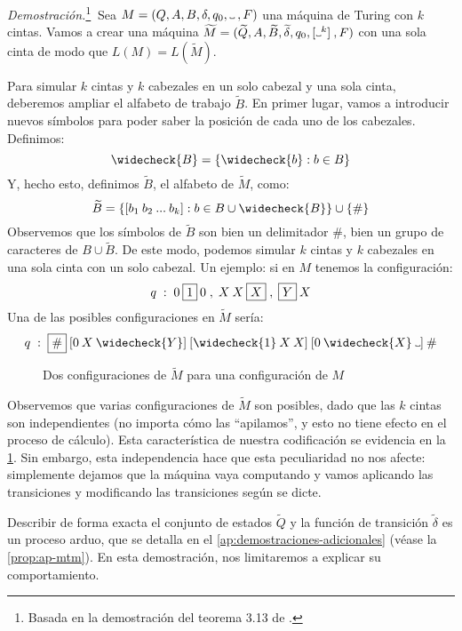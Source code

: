 \begin{proofw}
\emph{Demostración.}\footnote{Basada en la demostración del teorema 3.13 de \cite{Sipser2012}.}$\;\;$Sea $M=(Q, A, B, \delta, q_0, \Vtextvisiblespace\:, F)$ una máquina de Turing con $k$ cintas. Vamos a crear una máquina $\widetilde{M}=(\widetilde{Q}, A, \widetilde{B}, \widetilde{\delta}, q_0, [\Vtextvisiblespace^k]\:, F)$ con una sola cinta de modo que $L(M)=L(\widetilde{M})$. 

Para simular $k$ cintas y $k$ cabezales en un solo cabezal y una sola cinta, deberemos ampliar el alfabeto de trabajo $\widetilde{B}$. En primer lugar, vamos a introducir nuevos símbolos para poder saber la posición de cada uno de los cabezales. Definimos:
$$
    \widecheck{B}=\{\widecheck{b}:b\in B\}
$$
Y, hecho esto, definimos $\widetilde{B}$, el alfabeto de $\widetilde{M}$, como:
$$
    \widetilde{B}=\{[b_1\:b_2\:...\:b_k]:b\in B\cup\widecheck{B}\}\cup\{\#\}
$$
Observemos que los símbolos de $\widetilde{B}$ son bien un delimitador $\#$, bien un grupo de caracteres de $B\cup\widetilde{B}$. De este modo, podemos simular $k$ cintas y $k$ cabezales en una sola cinta con un solo cabezal. Un ejemplo: si en $M$ tenemos la configuración:
$$
    q\;:\;0\:\fbox{$1$}\:0\;,\;X\:X\:\fbox{$X$}\;,\;\fbox{$Y$}\:X
$$
Una de las posibles configuraciones en $\widetilde{M}$ sería:
$$
    q\;:\;\fbox{\#}\:[0\:X\:\widecheck{Y}]\:[\widecheck{1}\:X\:X]\:[0\:\widecheck{X}\:\Vtextvisiblespace]\:\#
$$


\begin{figure}[H]
\centering
\vspace*{8pt}

\caption{Dos configuraciones de $\widetilde{M}$ para una configuración de $M$}
\label{fig:configuraciones-mtilde}
\end{figure}

Observemos que varias configuraciones de $\widetilde{M}$ son posibles, dado que las $k$ cintas son independientes (no importa cómo las ``apilamos'', y esto no tiene efecto en el proceso de cálculo). Esta característica de nuestra codificación se evidencia en la \cref{fig:configuraciones-mtilde}. Sin embargo, esta independencia hace que esta peculiaridad no nos afecte: simplemente dejamos que la máquina vaya computando y vamos aplicando las transiciones y modificando las transiciones según se dicte.

Describir de forma exacta el conjunto de estados $\widetilde{Q}$ y la función de transición $\widetilde{\delta}$ es un proceso arduo, que se detalla en el \cref{ap:demostraciones-adicionales} (véase la \cref{prop:ap-mtm}). En esta demostración, nos limitaremos a explicar su comportamiento.


\end{proofw}
